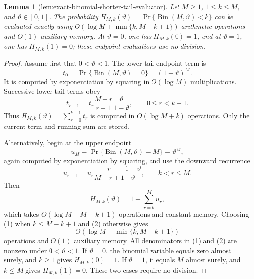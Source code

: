 \documentclass{article}
\newtheorem{lemma}{Lemma}
\begin{document}
\begin{lemma}[lem:exact-binomial-shorter-tail-evaluator]\label{lem:exact-binomial-shorter-tail-evaluator}
Let \(M\ge1\), \(1\le k\le M\), and \(\vartheta\in[0,1]\). The probability \(H_{M,k}(\vartheta)=\Pr\{\operatorname{Bin}(M,\vartheta)<k\}\) can be evaluated exactly using \(O(\log M+\min\{k,M-k+1\})\) arithmetic operations and \(O(1)\) auxiliary memory. At \(\vartheta=0\), one has \(H_{M,k}(0)=1\), and at \(\vartheta=1\), one has \(H_{M,k}(1)=0\); these endpoint evaluations use no division.
\end{lemma}
\begin{proof}
Assume first that \(0<\vartheta<1\). The lower-tail endpoint term is
\[
t_0=\Pr\{\operatorname{Bin}(M,\vartheta)=0\}=(1-\vartheta)^M.
\]
It is computed by exponentiation by squaring in \(O(\log M)\) multiplications. Successive lower-tail terms obey
\[
t_{r+1}=t_r\frac{M-r}{r+1}\frac{\vartheta}{1-\vartheta},\qquad 0\le r<k-1.
\tag{1}
\]
Thus \(H_{M,k}(\vartheta)=\sum_{r=0}^{k-1}t_r\) is computed in \(O(\log M+k)\) operations. Only the current term and running sum are stored.

Alternatively, begin at the upper endpoint
\[
u_M=\Pr\{\operatorname{Bin}(M,\vartheta)=M\}=\vartheta^M,
\]
again computed by exponentiation by squaring, and use the downward recurrence
\[
u_{r-1}=u_r\frac{r}{M-r+1}\frac{1-\vartheta}{\vartheta},\qquad k<r\le M.
\tag{2}
\]
Then
\[
H_{M,k}(\vartheta)=1-\sum_{r=k}^M u_r,
\]
which takes \(O(\log M+M-k+1)\) operations and constant memory. Choosing (1) when \(k\le M-k+1\) and (2) otherwise gives
\[
O\!\left(\log M+\min\{k,M-k+1\}\right)
\]
operations and \(O(1)\) auxiliary memory. All denominators in (1) and (2) are nonzero under \(0<\vartheta<1\). If \(\vartheta=0\), the binomial variable equals zero almost surely, and \(k\ge1\) gives \(H_{M,k}(0)=1\). If \(\vartheta=1\), it equals \(M\) almost surely, and \(k\le M\) gives \(H_{M,k}(1)=0\). These two cases require no division.
\end{proof}
\end{document}
